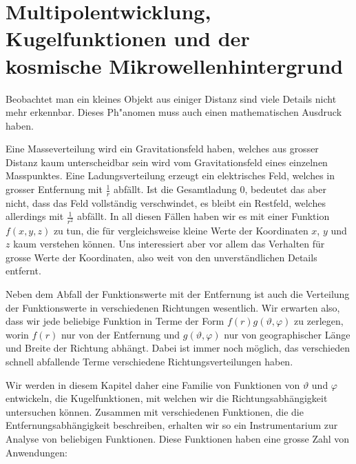 %
%
%
\chapter{Multipolentwicklung, Kugelfunktionen und der
kosmische Mikrowellenhintergrund
\label{skript:chapter:multipol}}
\rhead{}
Beobachtet man ein kleines Objekt aus einiger Distanz sind viele
Details nicht mehr erkennbar.
Dieses Ph"anomen muss auch einen mathematischen Ausdruck haben.

Eine Masseverteilung wird ein Gravitationsfeld haben, welches aus
grosser Distanz kaum unterscheidbar sein wird vom Gravitationsfeld
eines einzelnen Masspunktes.
Eine Ladungsverteilung erzeugt ein elektrisches Feld, welches in
grosser Entfernung mit $\frac1r$ abfällt.
Ist die Gesamtladung $0$, bedeutet das aber nicht, dass das
Feld vollständig verschwindet, es bleibt ein Restfeld, welches
allerdings mit $\frac1{r^2}$ abfällt.
In all diesen Fällen haben wir es mit einer Funktion $f(x,y,z)$ zu tun,
die für vergleichsweise kleine Werte der Koordinaten $x$, $y$ und $z$
kaum verstehen können.
Uns interessiert aber vor allem das Verhalten für grosse Werte der
Koordinaten, also weit von den unverständlichen Details entfernt.

Neben dem Abfall der Funktionswerte mit der Entfernung ist auch
die Verteilung der Funktionswerte in verschiedenen Richtungen wesentlich.
Wir erwarten also, dass wir jede beliebige Funktion in Terme der Form
$
f(r) g(\vartheta,\varphi)
$
zu zerlegen, worin $f(r)$ nur von der Entfernung und $g(\vartheta,\varphi)$
nur von geographischer Länge und Breite der Richtung abhängt.
Dabei ist immer noch möglich, das verschieden schnell abfallende
Terme verschiedene Richtungsverteilungen haben.

Wir werden in diesem Kapitel daher eine Familie von Funktionen
von $\vartheta$ und $\varphi$ entwickeln, die Kugelfunktionen,
mit welchen wir die Richtungsabhängigkeit untersuchen können.
Zusammen mit verschiedenen Funktionen, die die Entfernungsabhängigkeit
beschreiben, erhalten wir so ein Instrumentarium zur Analyse von
beliebigen Funktionen.
Diese Funktionen haben eine grosse Zahl von Anwendungen:

